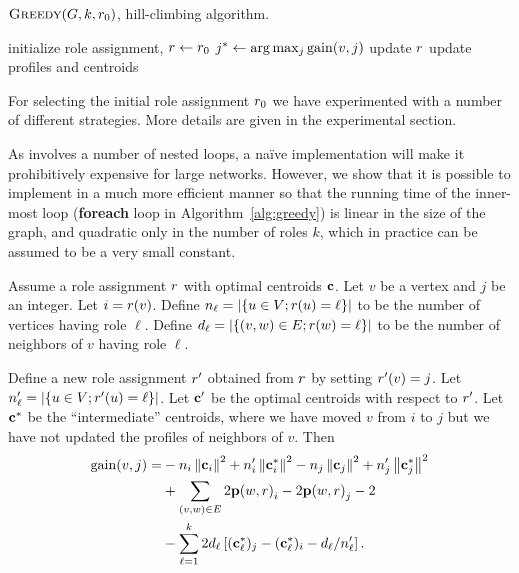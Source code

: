 \begin{algorithm}[t]
\caption{$\textsc{Greedy}(G, k, r_{0})$, hill-climbing algorithm.}
\label{alg:greedy}
initialize role assignment, $r \leftarrow r_{0}$\; 
 {
	 {
		$j^* \define \arg \max_j \gain{v, j}$\;
		 {
			update $r$\;
			update profiles and centroids\;
		}
	}
}
\end{algorithm}

For selecting the initial role assignment ${r}_{0}$
we have experimented with a number of different strategies. 
More details are given in the experimental section.

As \alggreedy involves a number of nested loops, 
a na\"{i}ve implementation will make it prohibitively expensive for large networks.
However, we show that it is possible to implement \alggreedy 
in a much more efficient manner
so that the running time of the inner-most loop
({\bf foreach} loop in Algorithm~\ref{alg:greedy}) 
is linear in the size of the graph, 
and quadratic only in the number of roles $k$, 
which in practice can be assumed to be a very small constant.

\begin{proposition}
\label{prop:fastgain}
Assume a role assignment $r$ with optimal centroids $\mathbf{c}$. 
Let $v$ be a vertex and $j$ be an integer.
Let $i = r(v)$.
Define $n_\ell = {\left|\left\{u \in V ; r(u) = \ell\right\}\right|}$ to be the number of vertices having role $\ell$.
Define $d_\ell = {\left|\left\{(v, w) \in E ; r(w) = \ell\right\}\right|}$ to be the number of neighbors of $v$ having role $\ell$.

Define a new role assignment $r'$ obtained from $r$ by setting $r'(v) = j$.
Let $n'_\ell = {\left|\left\{u \in V ; r'(u) = \ell\right\}\right|}$.
Let $\mathbf{c}'$ be the optimal centroids with respect to $r'$. 
Let $\mathbf{c}^*$ be the ``intermediate'' centroids, where we have moved $v$ from $i$ to $j$ but we have not
updated the profiles of neighbors of $v$.  Then 
\[
\begin{split}
	\gain{v, j} = 
	& - n_i\norm{\centroid_i}^2 + n_i'\norm{\centroid_i^*}^2 - n_j\norm{\centroid_j}^2 + n_j'\norm{\centroid_j^*}^2 \\
	& + \sum_{(v, w) \in E} 2\prof{w, \role}_i - 2\prof{w, \role}_j  - 2  \\
	& - \sum_{\ell = 1}^k 2d_\ell \spr{(\centroid_\ell^*)_j  - (\centroid_\ell^*)_i - d_\ell / n_\ell' }.  \\
\end{split}
\]
\end{proposition}

